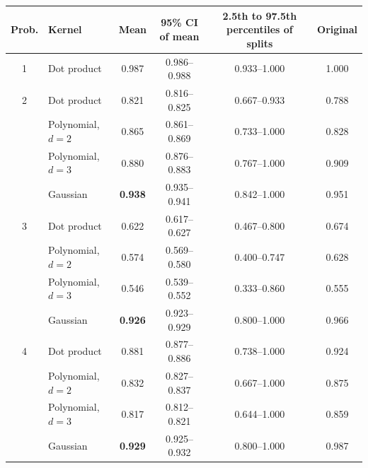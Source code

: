 \begin{tabular}{@{}clcccc@{}}
\toprule
Prob. & Kernel & Mean & 95\% CI of mean & 2.5th to 97.5th percentiles of splits & Original \\
\midrule
1 & Dot product & 0.987 & 0.986--0.988 & 0.933--1.000 & 1.000 \\
\midrule
2 & Dot product & 0.821 & 0.816--0.825 & 0.667--0.933 & 0.788 \\
 & Polynomial, $d=2$ & 0.865 & 0.861--0.869 & 0.733--1.000 & 0.828 \\
 & Polynomial, $d=3$ & 0.880 & 0.876--0.883 & 0.767--1.000 & 0.909 \\
 & Gaussian & \textbf{0.938} & 0.935--0.941 & 0.842--1.000 & 0.951 \\
\midrule
3 & Dot product & 0.622 & 0.617--0.627 & 0.467--0.800 & 0.674 \\
 & Polynomial, $d=2$ & 0.574 & 0.569--0.580 & 0.400--0.747 & 0.628 \\
 & Polynomial, $d=3$ & 0.546 & 0.539--0.552 & 0.333--0.860 & 0.555 \\
 & Gaussian & \textbf{0.926} & 0.923--0.929 & 0.800--1.000 & 0.966 \\
\midrule
4 & Dot product & 0.881 & 0.877--0.886 & 0.738--1.000 & 0.924 \\
 & Polynomial, $d=2$ & 0.832 & 0.827--0.837 & 0.667--1.000 & 0.875 \\
 & Polynomial, $d=3$ & 0.817 & 0.812--0.821 & 0.644--1.000 & 0.859 \\
 & Gaussian & \textbf{0.929} & 0.925--0.932 & 0.800--1.000 & 0.987 \\
\bottomrule
\end{tabular}
